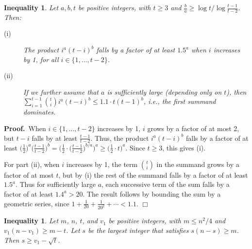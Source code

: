 \documentclass[11pt]{article}
\newtheorem{inequality}[theorem]{Inequality}
\begin{document}
\vspace{3mm}





\begin{inequality}
  \label{ineq:partition-colors}
  Let $a,b,t$ be positive integers, with $t \geq 3$ and $\frac{b}{a}
  \geq \log t / \log \frac{t-1}{t-2}$.  Then:
  \begin{description}
  \item[(i)] The product $i^a (t-i)^b$ falls by a factor of at least
    $1.5^a$ when $i$ increases by 1, for all $i \in \{1, \ldots,
    t-2\}$.
  \item[(ii)] If we further assume that $a$ is sufficiently large
    (depending only on $t$), then $\sum_{i=1}^{t-1} {t \choose i} i^a
    (t-i)^b \leq 1.1 \cdot t (t-1)^b$, i.e., the first summand
    dominates.
  \end{description}
\end{inequality}

\noindent \textbf{Proof.}\, When $i \in \{1, \ldots, t-2\}$ increases
by 1, $i$ grows by a factor of at most 2, but $t-i$ falls by at least
$\frac{t-1}{t-2}$.  Thus, the product $i^a (t-i)^b$ falls by a factor
of at least $\big(\frac{1}{2}\big)^a \big(\frac{t-1}{t-2}\big)^b =
\big(\frac{1}{2} \cdot \big(\frac{t-1}{t-2}\big)^{b/a}\big)^a \geq
\big(\frac{1}{2} \cdot t\big)^a$.  Since $t \geq 3$, this gives (i).

For part (ii), when $i$ increases by 1, the term ${t \choose i}$ in
the summand grows by a factor of at most $t$, but by (i) the rest of
the summand falls by a factor of at least $1.5^a$.  Thus for
sufficiently large $a$, each successive term of the sum falls by a
factor of at least $1.4^a > 20$.  The result follows by bounding the
sum by a geometric series, since $1 + \frac{1}{20} + \frac{1}{20^2} +
\cdots < 1.1$.  \hfill $\Box$




\vspace{3mm}

\begin{inequality}
  \label{ineq:exact:q=3:claim5}
  Let $m$, $n$, $t$, and $v_1$ be positive integers, with $m \leq
  n^2/4$ and $v_1 (n-v_1) \geq m-t$.  Let $s$ be the largest integer
  that satisfies $s(n-s) \geq m$.  Then $s \geq v_1 - \sqrt{t}$.
\end{inequality}
\end{document}
